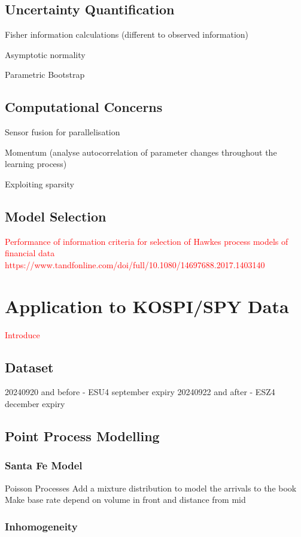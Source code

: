 \documentclass[honours,12pt]{unswthesis}
\numberwithin{equation}{section}
\begin{document}
\section{Uncertainty Quantification}
Fisher information calculations (different to observed information)

Asymptotic normality

Parametric Bootstrap

\section{Computational Concerns}
Sensor fusion for parallelisation

Momentum (analyse autocorrelation of parameter changes throughout the learning process)

Exploiting sparsity \cite{NickelLe}

\section{Model Selection}

\textcolor{red}{Performance of information criteria for selection of Hawkes process models of financial data https://www.tandfonline.com/doi/full/10.1080/14697688.2017.1403140}


\chapter{Application to KOSPI/SPY Data} %

\textcolor{red}{Introduce}

\section{Dataset}

20240920 and before - ESU4 september expiry
20240922 and after - ESZ4 december expiry

\section{Point Process Modelling}
\subsection{Santa Fe Model}
Poisson Processes
Add a mixture distribution to model the arrivals to the book
Make base rate depend on volume in front and distance from mid
\subsection{Inhomogeneity}
\end{document}
